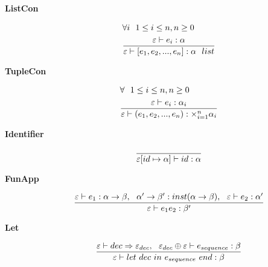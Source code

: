 \documentclass[10pt]{luthercs}
\begin{document}
{\begin{description}
\item[{\textbf{ListCon}}] \begin{gather}
\begin{split}& \forall i~~1\leq i \leq n, n \geq 0\\
& \frac{\varepsilon\vdash e_i:\alpha}{\varepsilon\vdash [e_1,e_2,...,e_n] : \alpha~~list}\end{split}\notag
\end{gather}
\end{description}


\begin{description}
\item[{\textbf{TupleCon}}] \begin{gather}
\begin{split}& \forall ~~1\leq i \leq n, n \geq 0\\
& \frac{\varepsilon\vdash e_i:\alpha_i}{\varepsilon\vdash (e_1,e_2,...,e_n) : \times_{i=1}^n \alpha_i}\end{split}\notag
\end{gather}
\end{description}


\begin{description}
\item[{\textbf{Identifier}}] \begin{gather}
\begin{split}\frac{}{\varepsilon[id \mapsto \alpha]\vdash id : \alpha}\end{split}\notag
\end{gather}
\end{description}


\begin{description}
\item[{\textbf{FunApp}}] \begin{gather}
\begin{split}\frac{\varepsilon\vdash e_1 : \alpha\rightarrow\beta, ~~ \alpha'\rightarrow\beta':inst(\alpha\rightarrow\beta),~~ \varepsilon\vdash e_2 : \alpha'}
     {\varepsilon\vdash e_1 e_2 : \beta'}\end{split}\notag
\end{gather}
\end{description}


\begin{description}
\item[{\textbf{Let}}] \begin{gather}
\begin{split}\frac{\varepsilon\vdash dec\Rightarrow\varepsilon_{dec},~~\varepsilon_{dec}\oplus\varepsilon\vdash e_{sequence}:\beta}{\varepsilon\vdash let~dec~in~e_{sequence}~end:\beta}\end{split}\notag
\end{gather}
\end{description}


}
\end{document}
